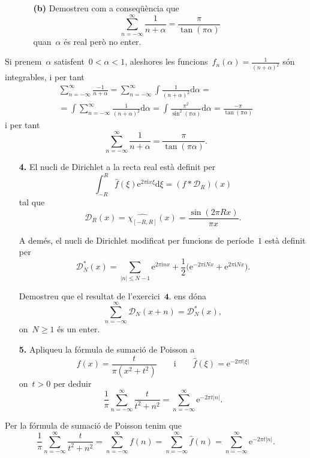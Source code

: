 \documentclass[a4paper]{article}
\theoremstyle{plain}
\newcommand{\iu}{\mathrm{i}}
\newcommand{\e}{\mathrm{e}}
\providecommand{\uppi}{\pi}
\newcommand{\diff}{\mathrm{d}}
\newcommand{\abs}[1]{\lvert{#1}\rvert}
\newcommand{\D}{\mathcal{D}}
\begin{document}
\begin{enumerate}
    \item[]\begin{enumerate}
        \item[\textbf{(b)}] Demostreu com a conseqüència que
            \[
                \sum_{n=-\infty}^{\infty} \frac{1}{n+\alpha}
                = \frac{\uppi}{\tan(\uppi\alpha)}
            \]
            quan~\(\alpha\) és real però no enter.
    \end{enumerate}
\end{enumerate}

Si prenem~\(\alpha\) satisfent~\(0<\alpha<1\), aleshores les
funcions~\(f_{n}(\alpha)=\frac{1}{(n+\alpha)^{2}}\) són integrables, i per tant
\begin{multline*}
    \sum_{n=-\infty}^{\infty}
    \frac{-1}{n+\alpha}
    =
    \sum_{n=-\infty}^{\infty}
    \int
    \frac{1}{(n+\alpha)^{2}}
    \diff\alpha
    = \\ =
    \int
    \sum_{n=-\infty}^{\infty}
    \frac{1}{(n+\alpha)^{2}}
    \diff\alpha
    =
    \int
    \frac{\uppi^{2}}{\sin^{2}(\uppi\alpha)}
    \diff\alpha
    =
    \frac{-\uppi}{\tan(\uppi\alpha)}
\end{multline*}
i per tant
\[
    \sum_{n=-\infty}^{\infty} \frac{1}{n+\alpha}
    = \frac{\uppi}{\tan(\uppi\alpha)}.
\]

\begin{enumerate}
    \item[\textbf{4.}] El nucli de Dirichlet a la recta real està definit per
        \[
            \int_{-R}^{R}\widehat{f}(\xi)\e^{2\uppi\iu x\xi}\diff\xi
            = (f\ast \D_{R})(x)
        \]
        tal que
        \[
            \D_{R}(x) = \widehat{\chi_{[-R,R]}}(x)
            = \frac{\sin(2\uppi Rx)}{\uppi x}.
        \]

        A demés, el nucli de Dirichlet modificat per funcions de període~\(1\)
        està definit per
        \[
            \D^{\ast}_{N}(x)
            = \sum_{\abs{n} \leq N-1} \e^{2\uppi\iu nx}
            + \frac{1}{2}\bigl(\e^{-2\uppi\iu Nx} + \e^{2\uppi\iu Nx}\bigr).
        \]

        Demostreu que el resultat de l'exercici~\(\textbf{4.}\) ens dóna
        \[
            \sum_{n=-\infty}^{\infty} \D_{N}(x+n) = \D^{\ast}_{N}(x),
        \]
        on~\(N\geq1\) és un enter.
\end{enumerate}

\begin{enumerate}
    \item[\textbf{5.}] Apliqueu la fórmula de sumació de Poisson a
        \[
            f(x) = \frac{t}{\uppi(x^{2}+t^{2})}
            \qquad
            \text{i}
            \qquad
            \widehat{f}(\xi) = \e^{-2\uppi t\abs{\xi}}
        \]
        on~\(t>0\) per deduir
        \[
            \frac{1}{\uppi}
            \sum_{n=-\infty}^{\infty}
            \frac{t}{t^{2}+n^{2}}
            =
            \sum_{n=-\infty}^{\infty}
            \e^{-2\uppi t\abs{n}}.
        \]
\end{enumerate}

Per la fórmula de sumació de Poisson tenim que
\[
    \frac{1}{\uppi}
    \sum_{n=-\infty}^{\infty}
    \frac{t}{t^{2}+n^{2}}
    =
    \sum_{n=-\infty}^{\infty} f(n)
    =
    \sum_{n=-\infty}^{\infty} \widehat{f}(n)
    =
    \sum_{n=-\infty}^{\infty}
    \e^{-2\uppi t\abs{n}}.
\]
\end{document}
